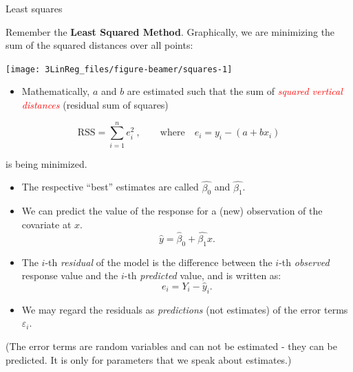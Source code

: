 \documentclass[10pt,ignorenonframetext,]{beamer}
\providecommand{\tightlist}{%
  \setlength{\itemsep}{0pt}\setlength{\parskip}{0pt}}
\begin{document}
\begin{frame}

\begin{block}{Least squares}

\vspace{2mm}

Remember the \textbf{Least Squared Method}. Graphically, we are
minimizing the sum of the squared distances over all points:

\begin{center}\texttt{[image: 3LinReg\_files/figure-beamer/squares-1]} \end{center}

\end{block}

\end{frame}

\begin{frame}

\begin{itemize}
\tightlist
\item
  Mathematically, \(a\) and \(b\) are estimated such that the sum of
  \emph{\textcolor{red}{squared vertical distances}} (residual sum of
  squares)
\end{itemize}

\[\text{RSS} = \sum_{i=1}^n e_i^2 \ , \qquad \text{where} \quad e_i = y_i - (a + b x_i) \]

is being minimized.

\begin{itemize}
\item
  The respective ``best'' estimates are called \(\hat{\beta_0}\) and
  \(\hat{\beta_1}\).
\item
  We can predict the value of the response for a (new) observation of
  the covariate at \(x\). \[\hat{y} = \hat{\beta}_0 + \hat{\beta_1}x.\]
\item
  The \(i\)-th \emph{residual} of the model is the difference between
  the \(i\)-th \emph{observed} response value and the \(i\)-th
  \emph{predicted} value, and is written as: \[e_i = Y_i - \hat{y}_i.\]
\item
  We may regard the residuals as \emph{predictions} (not estimates) of
  the error terms \(\varepsilon_i\).
\end{itemize}

\tiny
(The error terms are random variables and can not be estimated - they
can be predicted. It is only for parameters that we speak about
estimates.)

\end{frame}
\end{document}
